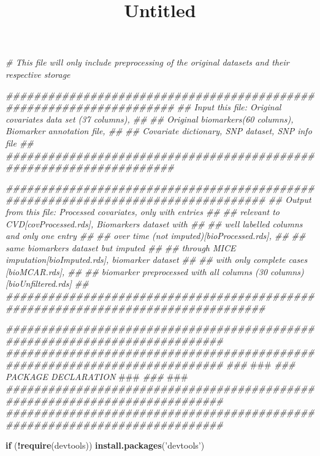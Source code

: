 \documentclass[]{article}
\title{Untitled}
\author{}
\date{\vspace{-2.5em}}
\newenvironment{Shaded}{\begin{snugshade}}{\end{snugshade}}
\newcommand{\AlertTok}[1]{\textcolor[rgb]{0.94,0.16,0.16}{#1}}
\newcommand{\CommentTok}[1]{\textcolor[rgb]{0.56,0.35,0.01}{\textit{#1}}}
\newcommand{\ControlFlowTok}[1]{\textcolor[rgb]{0.13,0.29,0.53}{\textbf{#1}}}
\newcommand{\KeywordTok}[1]{\textcolor[rgb]{0.13,0.29,0.53}{\textbf{#1}}}
\newcommand{\NormalTok}[1]{#1}
\newcommand{\OperatorTok}[1]{\textcolor[rgb]{0.81,0.36,0.00}{\textbf{#1}}}
\newcommand{\StringTok}[1]{\textcolor[rgb]{0.31,0.60,0.02}{#1}}
\begin{document}
\maketitle

\begin{Shaded}
\begin{Highlighting}[]
\CommentTok{# This file will only include preprocessing of the original datasets and their respective storage}

\CommentTok{####################################################################}
\CommentTok{##  Input this file: Original covariates data set (37 columns),   ##}
\CommentTok{##   Original biomarkers(60 columns), Biomarker annotation file,  ##}
\CommentTok{##         Covariate dictionary, SNP dataset, SNP info file       ##}
\CommentTok{####################################################################}

\CommentTok{#################################################################################}
\CommentTok{##       Output from this file: Processed covariates, only with entries        ##}
\CommentTok{##          relevant to CVD[covProcessed.rds], Biomarkers dataset with         ##}
\CommentTok{##                   well labelled columns and only one entry                  ##}
\CommentTok{##                  over time (not imputed)[bioProcessed.rds],                 ##}
\CommentTok{##                     same biomarkers dataset but imputed                     ##}
\CommentTok{##          through MICE imputation[bioImputed.rds], biomarker dataset         ##}
\CommentTok{##                   with only complete cases [bioMCAR.rds],                   ##}
\CommentTok{##   biomarker preprocessed with all columns (30 columns)[bioUnfiltered.rds]   ##}
\CommentTok{#################################################################################}

\CommentTok{###########################################################################}
\CommentTok{###########################################################################}
\CommentTok{###                                                                     }\AlertTok{###}
\CommentTok{###                         PACKAGE DECLARATION                         }\AlertTok{###}
\CommentTok{###                                                                     }\AlertTok{###}
\CommentTok{###########################################################################}
\CommentTok{###########################################################################}


\ControlFlowTok{if}\NormalTok{ (}\OperatorTok{!}\KeywordTok{require}\NormalTok{(devtools)) }\KeywordTok{install.packages}\NormalTok{(}\StringTok{'devtools'}\NormalTok{)}
\end{Highlighting}
\end{Shaded}
\end{document}
